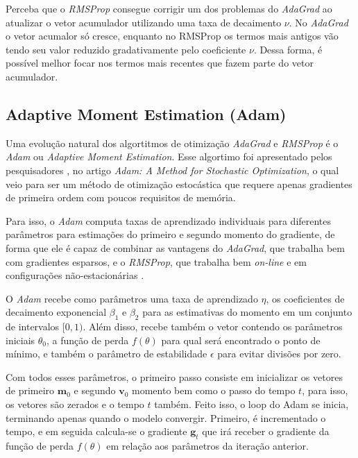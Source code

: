 Perceba que o \textit{RMSProp} consegue corrigir um dos problemas do \textit{AdaGrad} ao atualizar o vetor acumulador utilizando uma taxa de decaimento $\nu$. No \textit{AdaGrad} o vetor acumalor só cresce, enquanto no RMSProp os termos mais antigos vão tendo seu valor reduzido gradativamente pelo coeficiente $\nu$. Dessa forma, é possível melhor focar nos termos mais recentes que fazem parte do vetor acumulador.

\subsection{Adaptive Moment Estimation (Adam)}

Uma evolução natural dos algortitmos de otimização \textit{AdaGrad} e \textit{RMSProp} é o \textit{Adam} ou \textit{Adaptive Moment Estimation}. Esse algortimo foi apresentado pelos pesquisadores \textcite{AdamMethod}, no artigo \textit{Adam: A Method for Stochastic Optimization}, o qual veio para ser um método de otimização estocástica que requere apenas gradientes de primeira ordem com poucos requisitos de memória.

Para isso, o \textit{Adam} computa taxas de aprendizado individuais para diferentes parâmetros para estimações do primeiro e segundo momento do gradiente, de forma que ele é capaz de combinar as vantagens do \textit{AdaGrad}, que trabalha bem com gradientes esparsos, e o \textit{RMSProp}, que trabalha bem \textit{on-line} e em configurações não-estacionárias \parencite{AdamMethod}.

O \textit{Adam} recebe como parâmetros uma taxa de aprendizado $\eta$, os coeficientes de decaimento exponencial $\beta_1$ e $\beta_2$ para as estimativas do momento em um conjunto de intervalos $[0, 1)$. Além disso, recebe também o vetor contendo os parâmetros iniciais $\theta_0$, a função de perda $f(\theta)$ para qual será encontrado o ponto de mínimo, e também o parâmetro de estabilidade $\epsilon$ para evitar divisões por zero.

Com todos esses parâmetros, o primeiro passo consiste em inicializar os vetores de primeiro $\mathbf{m}_0$ e segundo $\mathbf{v}_0$ momento bem como o passo do tempo $t$, para isso, os vetores são zerados e o tempo $t$ também. Feito isso, o loop do Adam se inicia, terminando apenas quando o modelo convergir. Primeiro, é incrementado o tempo, e em seguida calcula-se o gradiente $\mathbf{g}_t$ que irá receber o gradiente da função de perda $f(\theta)$ em relação aos parâmetros da iteração anterior.

